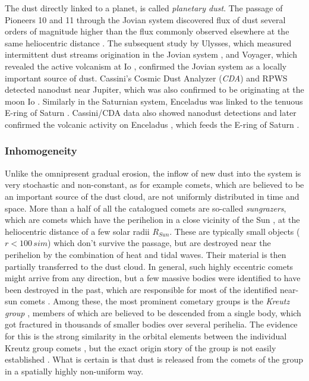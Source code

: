 The dust directly linked to a planet, is called \textit{planetary dust}. The passage of Pioneers 10 and 11 through the Jovian system discovered flux of dust several orders of magnitude higher than the flux commonly observed elsewhere at the same heliocentric distance \citep{humes1974interplanetary}. The subsequent study by Ulysses, which measured intermittent dust streams origination in the Jovian system \citep{grun1993discovery}, and Voyager, which revealed the active volcanism at Io \citep{kruger2004jovian}, confirmed the Jovian system as a locally important source of dust. Cassini's Cosmic Dust Analyzer (\textit{CDA}) and RPWS detected nanodust near Jupiter, which was also confirmed to be originating at the moon Io \citep{meyer2009detecting}. Similarly in the Saturnian system, Enceladus was linked to the tenuous E-ring of Saturn \citep{baum1981saturn}. Cassini/CDA data also showed nanodust detections \citep{kempf2005high} and later confirmed the volcanic activity on Enceladus \citep{spahn2006cassini}, which feeds the E-ring of Saturn \citep{kempf2010enceladus}. 

\subsubsection{Inhomogeneity}

Unlike the omnipresent gradual erosion, the inflow of new dust into the system is very stochastic and non-constant, as for example comets, which are believed to be an important source of the dust cloud, are not uniformly distributed in time and space. More than a half of all the catalogued comets are so-called \textit{sungrazers}, which are comets which have the perihelion in a close vicinity of the Sun \citep{jones2018science}, at the heliocentric distance of a few solar radii $R_{Sun}$. These are typically small objects ($r<100 \, si{m}$) which don't survive the passage, but are destroyed near the perihelion by the combination of heat and tidal waves. Their material is then partially transferred to the dust cloud. In general, such highly eccentric comets might arrive from any direction, but a few massive bodies were identified to have been destroyed in the past, which are responsible for most of the identified near-sun comets \citep{jones2018science}. Among these, the most prominent cometary groups is the \textit{Kreutz group} \citep{kreutz1888untersuchungen}, members of which are believed to be descended from a single body, which got fractured in thousands of smaller bodies over several perihelia. The evidence for this is the strong similarity in the orbital elements between the individual Kreutz group comets \citep{jones2018science}, but the exact origin story of the group is not easily established \citep{kalinicheva2017specific,fernandez2021origin}. What is certain is that dust is released from the comets of the group in a spatially highly non-uniform way. 

